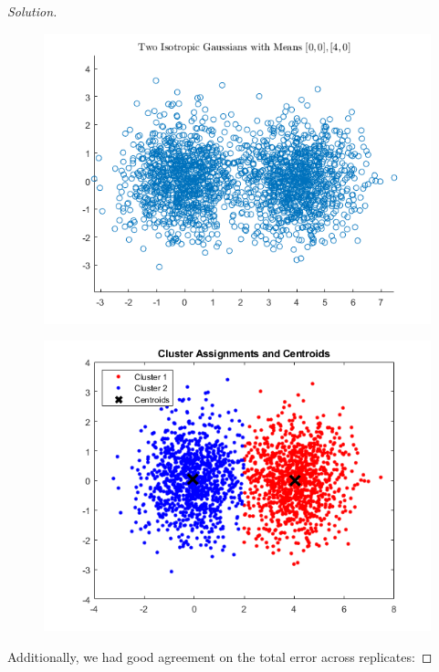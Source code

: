 \documentclass[10pt]{article}
\begin{document}
\begin{proof}[Solution]
\begin{figure}[H]
\centering
\begin{minipage}{.5\textwidth}
  \centering
  \includegraphics[width=\linewidth]{gaussian_points}
  \label{fig:test1}
\end{minipage}%
\begin{minipage}{.5\textwidth}
  \centering
  \includegraphics[width=\linewidth]{gaussian_cluster_assignments}
  \label{fig:test2}
\end{minipage}
\end{figure}

Additionally, we had good agreement on the total error across replicates:


\end{proof}
\end{document}
